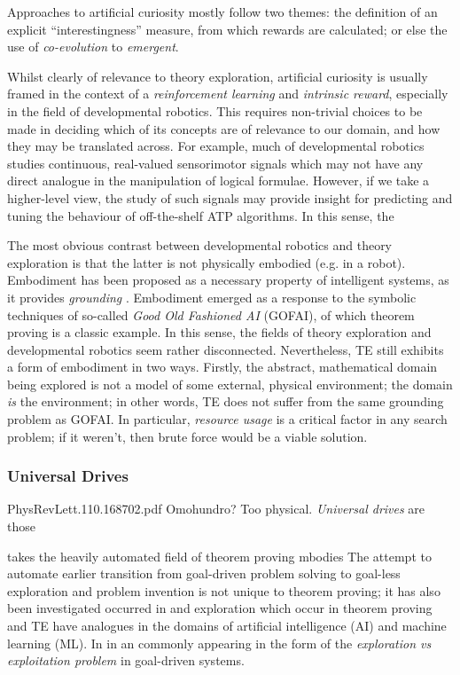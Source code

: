 \documentclass[]{article}
\begin{document}

Approaches to artificial curiosity mostly follow two themes: the definition of an explicit ``interestingness'' measure, from which rewards are calculated; or else the use of \emph{co-evolution} to \emph{emergent}.

Whilst clearly of relevance to theory exploration, artificial curiosity is usually framed in the context of a \emph{reinforcement learning} and \emph{intrinsic reward}, especially in the field of developmental robotics. This requires non-trivial choices to be made in deciding which of its concepts are of relevance to our domain, and how they may be translated across. For example, much of developmental robotics studies continuous, real-valued sensorimotor signals which may not have any direct analogue in the manipulation of logical formulae. However, if we take a higher-level view, the study of such signals may provide insight for predicting and tuning the behaviour of off-the-shelf ATP algorithms. In this sense, the

The most obvious contrast between developmental robotics and theory exploration is that the latter is not physically embodied (e.g. in a robot). Embodiment has been proposed as a necessary property of intelligent systems, as it provides \emph{grounding} \cite{anderson2003embodied}. Embodiment emerged as a response to the symbolic techniques of so-called \emph{Good Old Fashioned AI} (GOFAI), of which theorem proving is a classic example. In this sense, the fields of theory exploration and developmental robotics seem rather disconnected. Nevertheless, TE still exhibits a form of embodiment in two ways. Firstly, the abstract, mathematical domain being explored is not a model of some external, physical environment; the domain \emph{is} the environment; in other words, TE does not suffer from the same grounding problem as GOFAI. In particular, \emph{resource usage} is a critical factor in any search problem; if it weren't, then brute force would be a viable solution.

\subsubsection{Universal Drives}

PhysRevLett.110.168702.pdf
Omohundro? Too physical.
\emph{Universal drives} are those

 takes the heavily automated field of theorem proving   mbodies The attempt to automate earlier transition from goal-driven problem solving to goal-less exploration and problem invention is not unique to theorem proving; it has also been investigated occurred in  and exploration which occur in theorem proving and TE have analogues in the domains of artificial intelligence (AI) and machine learning (ML). In  in an commonly appearing in the form of the \emph{exploration vs exploitation problem} in goal-driven systems.
\end{document}
